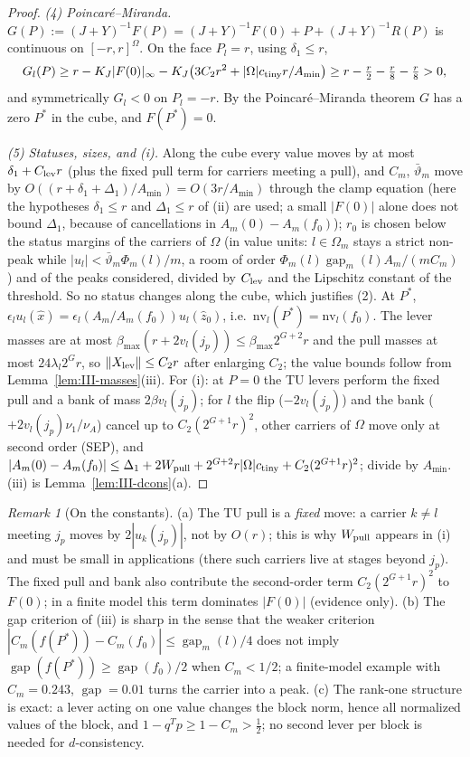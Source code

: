 \documentclass[10pt]{amsart}
\theoremstyle{definition}
\theoremstyle{remark}
\newtheorem{remark}[theorem]{Remark}
\newcommand{\gap}{\operatorname{gap}}
\newcommand{\zh}{\hat z}
\begin{document}
\begin{proof}
\emph{(4) Poincar\'e--Miranda.}  $G(P):=(J+Y)^{-1}F(P)=(J+Y)^{-1}F(0)+P+
(J+Y)^{-1}R(P)$ is continuous on $[-r,r]^\Omega$.  On the face $P_l=r$, using
$\delta_1\le r$,
\[
 G_l(P)\ge r-K_J|F(0)|_\infty-K_J\big(3C_2r^2+|\Omega|c_{\rm tiny}r/A_{\min}\big)
 \ge r-\tfrac r2-\tfrac r8-\tfrac r8>0,
\]
and symmetrically $G_l<0$ on $P_l=-r$.  By the Poincar\'e--Miranda theorem \cite{Miranda} $G$
has a zero $P^*$ in the cube, and $F(P^*)=0$.

\emph{(5) Statuses, sizes, and (i).}  Along the cube every value moves by at most
$\delta_1+C_{\rm lev}r$ (plus the fixed pull term for carriers meeting a pull),
and $C_m$, $\bar\vartheta_m$ move by $O((r+\delta_1+\Delta_1)/A_{\min})=
O(3r/A_{\min})$ through the clamp equation (here the hypotheses $\delta_1\le r$
and $\Delta_1\le r$ of (ii) are used; a small $|F(0)|$ alone does not bound
$\Delta_1$, because of cancellations in $A_m(0)-A_m(f_0)$); $r_0$ is chosen below the status margins of the carriers of
$\Omega$ \textup{(}in value units: $l\in\Omega_m$ stays a strict non-peak while
$|u_l|<\bar\vartheta_m\Phi_m(l)/m$, a room of order $\Phi_m(l)\gap_m(l)A_m/
(mC_m)$\textup{)} and of the peaks considered, divided by $C_{\rm lev}$ and the
Lipschitz constant of the threshold.  So no status changes along the cube, which
justifies (2).  At $P^*$, $\epsilon_lu_l(\hat x)=\epsilon_l(A_m/A_m(f_0))u_l(\zh_0)$,
i.e.\ $\mathrm{nv}_l(P^*)=\mathrm{nv}_l(f_0)$.  The lever masses are at most
$\beta_{\max}(r+2v_l(j_p))\le\beta_{\max}2^{G+2}r$ and the pull masses at most
$24\lambda_l2^Gr$, so $\|X_{\rm lev}\|\le C_2r$ after enlarging $C_2$; the value
bounds follow from Lemma~\ref{lem:III-masses}(iii).  For (i): at $P=0$ the TU
levers perform the fixed pull and a bank of mass $2\beta v_l(j_p)$; for $l$ the
flip ($-2v_l(j_p)$) and the bank ($+2v_l(j_p)\nu_1/\nu_A$) cancel up to
$C_2(2^{G+1}r)^2$, other carriers of $\Omega$ move only at second order
(SEP), and $|A_m(0)-A_m(f_0)|\le\Delta_1+2W_{\rm pull}+2^{G+2}r|\Omega|c_{\rm tiny}
+C_2(2^{G+1}r)^2$; divide by $A_{\min}$.  (iii) is
Lemma~\ref{lem:III-dcons}(a).
\end{proof}

\begin{remark}[On the constants]\label{rem:III-DC}
(a) The TU pull is a \emph{fixed} move: a carrier $k\ne l$ meeting $j_p$ moves by
$2|u_k(j_p)|$, not by $O(r)$; this is why $W_{\rm pull}$ appears in (i) and
must be small in applications (there such carriers live at stages beyond
$j_p$).  The fixed pull and bank also contribute the second-order term
$C_2(2^{G+1}r)^2$ to $F(0)$; in a finite model this term dominates $|F(0)|$
(evidence only).  (b) The gap criterion of (iii) is sharp in the sense that the
weaker criterion $|C_m(f(P^*))-C_m(f_0)|\le\gap_m(l)/4$ does not imply
$\gap(f(P^*))\ge\gap(f_0)/2$ when $C_m<1/2$; a finite-model example with
$C_m=0.243$, $\gap=0.01$ turns the carrier into a peak.  (c) The rank-one
structure is exact: a lever acting on one value changes the block norm, hence all
normalized values of the block, and $1-q^Tp\ge1-C_m>\frac12$; no second lever per
block is needed for $d$-consistency.
\end{remark}
\end{document}
